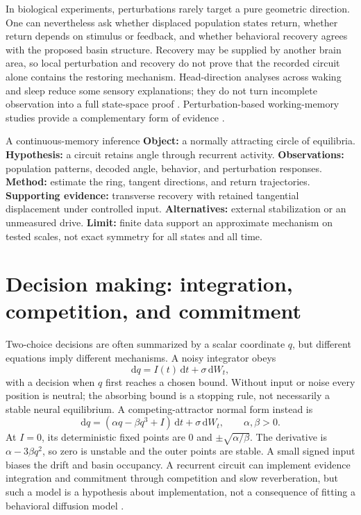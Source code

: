 In biological experiments, perturbations rarely target a pure geometric direction. One can nevertheless ask whether displaced population states return, whether return depends on stimulus or feedback, and whether behavioral recovery agrees with the proposed basin structure. Recovery may be supplied by another brain area, so local perturbation and recovery do not prove that the recorded circuit alone contains the restoring mechanism. Head-direction analyses across waking and sleep reduce some sensory explanations; they do not turn incomplete observation into a full state-space proof \citep{app_chaudhuri2019}. Perturbation-based working-memory studies provide a complementary form of evidence \citep{app_inagaki2019}.

\begin{insight}{A continuous-memory inference}
\textbf{Object:} a normally attracting circle of equilibria. \textbf{Hypothesis:} a circuit retains angle through recurrent activity. \textbf{Observations:} population patterns, decoded angle, behavior, and perturbation responses. \textbf{Method:} estimate the ring, tangent directions, and return trajectories. \textbf{Supporting evidence:} transverse recovery with retained tangential displacement under controlled input. \textbf{Alternatives:} external stabilization or an unmeasured drive. \textbf{Limit:} finite data support an approximate mechanism on tested scales, not exact symmetry for all states and all time.
\end{insight}

\section{Decision making: integration, competition, and commitment}
Two-choice decisions are often summarized by a scalar coordinate $q$, but different equations imply different mechanisms. A noisy integrator obeys
\begin{equation}
 \mathrm dq=I(t)\,\mathrm dt+\sigma\,\mathrm dW_t,
\end{equation}
with a decision when $q$ first reaches a chosen bound. Without input or noise every position is neutral; the absorbing bound is a stopping rule, not necessarily a stable neural equilibrium. A competing-attractor normal form instead is
\begin{equation}
 \mathrm dq=(\alpha q-\beta q^3+I)\,\mathrm dt
              +\sigma\,\mathrm dW_t,
 \qquad\alpha,\beta>0.\label{eq:07-choice}
\end{equation}
At $I=0$, its deterministic fixed points are $0$ and $\pm\sqrt{\alpha/\beta}$. The derivative is $\alpha-3\beta q^2$, so zero is unstable and the outer points are stable. A small signed input biases the drift and basin occupancy. A recurrent circuit can implement evidence integration and commitment through competition and slow reverberation, but such a model is a hypothesis about implementation, not a consequence of fitting a behavioral diffusion model \citep{app_wang2002}.

